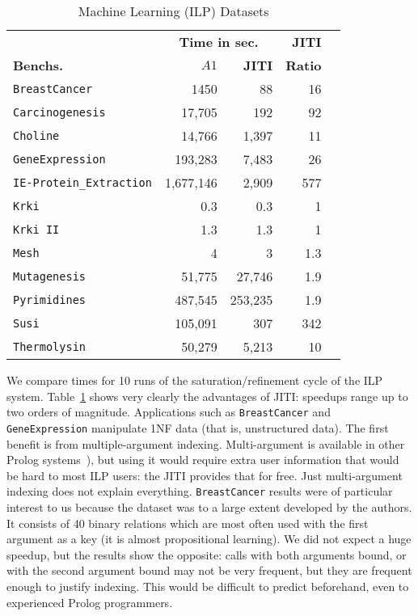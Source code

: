 \documentclass{llncs}
\begin{document}
\begin{table}[ht]
  \centering
  \begin {tabular}{|l|r|r|r|r|} \hline %
    &  \multicolumn{2}{|c|}{\bf Time in sec.}  & \bf JITI \\
    {\bf Benchs.}  & \bf $A1$   & \bf JITI & \bf Ratio \\
    \hline
    \texttt{BreastCancer}      & 1450    & 88 & 16\\
    \texttt{Carcinogenesis}    & 17,705    & 192  &92\\
    \texttt{Choline}           & 14,766    & 1,397  & 11  \\
    \texttt{GeneExpression}    & 193,283     & 7,483    & 26    \\
    \texttt{IE-Protein\_Extraction} &  1,677,146      & 2,909    & 577    \\
    \texttt{Krki}              & 0.3        & 0.3      & 1      \\
    \texttt{Krki II}           & 1.3     & 1.3     & 1     \\
    \texttt{Mesh}              & 4    & 3  & 1.3  \\
    \texttt{Mutagenesis}       & 51,775  & 27,746 & 1.9\\
    \texttt{Pyrimidines}       & 487,545     & 253,235  & 1.9    \\
    \texttt{Susi}              & 105,091    & 307    & 342  \\
    \texttt{Thermolysin}       & 50,279      &  5,213     & 10      \\
    \hline
\end{tabular}
\caption{Machine Learning (ILP) Datasets}
\label{tab:aleph}
\end{table}

We compare times for 10 runs of the saturation/refinement cycle of the
ILP system.  Table~\ref{tab:aleph} shows very clearly the advantages
of JITI: speedups range up to two orders of magnitude.  Applications
such as \texttt{BreastCancer} and \texttt{GeneExpression} manipulate
1NF data (that is, unstructured data). The first benefit is from
multiple-argument indexing. Multi-argument is available in other
Prolog systems~\cite{BIM,xsb-manual,ZhTaUs-small,SWI}), but using
it would require extra user information that would be hard to most ILP
users: the JITI provides that for free.  Just multi-argument indexing
does not explain everything.  \texttt{BreastCancer} results were of
particular interest to us because the dataset was to a large extent
developed by the authors. It consists of 40 binary relations which are
most often used with the first argument as a key (it is almost
propositional learning). We did not expect a huge speedup, but the
results show the opposite: calls with both arguments bound, or with
the second argument bound may not be very frequent, but they are
frequent enough to justify indexing.  This would be difficult to
predict beforehand, even to experienced Prolog programmers.
\end{document}
